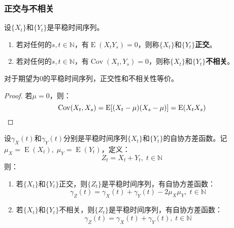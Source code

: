 \subsubsection{正交与不相关}
\begin{definition}
	设$\{X_t\}$和$\{Y_t\}$是平稳时间序列。
	\begin{enumerate}
		\item 若对任何的$s,t\in\mathbb{N}$，有$\operatorname{E}(X_tY_s)=0$，则称$\{X_t\}$和$\{Y_t\}$\textbf{正交}。
		\item 若对任何的$s,t\in\mathbb{N}$，有$\operatorname{Cov}(X_t,Y_s)=0$，则称$\{X_t\}$和$\{Y_t\}$\textbf{不相关}。
	\end{enumerate}
\end{definition}
\begin{theorem}
	对于期望为$0$的平稳时间序列，正交性和不相关性等价。
\end{theorem}
\begin{proof}
	若$\mu=0$，则：
	\begin{equation*}
		\operatorname{Cov}(X_t,X_s)=\operatorname{E}[(X_t-\mu)(X_s-\mu)]=\operatorname{E}(X_tX_s)\qedhere
	\end{equation*}
\end{proof}
\begin{theorem}
	设$\gamma_X(t)$和$\gamma_Y(t)$分别是平稳时间序列$\{X_t\}$和$\{Y_t\}$的自协方差函数。记$\mu_X=\operatorname{E}(X_t),\;\mu_Y=\operatorname{E}(Y_t)$，定义：
	\begin{equation*}
		Z_t=X_t+Y_t,\;t\in\mathbb{N}
	\end{equation*}
	则：
	\begin{enumerate}
		\item 若$\{X_t\}$和$\{Y_t\}$正交，则$\{Z_t\}$是平稳时间序列，有自协方差函数：
		\begin{equation*}
			\gamma_Z(t)=\gamma_X(t)+\gamma_Y(t)-2\mu_X\mu_Y,\;t\in\mathbb{N}
		\end{equation*}
		\item 若$\{X_t\}$和$\{Y_t\}$不相关，则$\{Z_t\}$是平稳时间序列，有自协方差函数：
		\begin{equation*}
			\gamma_Z(t)=\gamma_X(t)+\gamma_Y(t),\;t\in\mathbb{N}
		\end{equation*}
	\end{enumerate}
\end{theorem}
